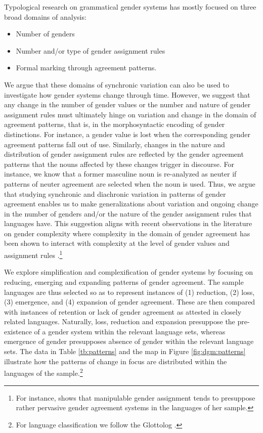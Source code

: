 \documentclass[output=collectionpaper]{langsci/langscibook}
\begin{document}
Typological research on grammatical gender systems  has mostly focused on three broad domains of analysis:
\begin{itemize}
\item Number of genders
\item Number and/or type of gender assignment rules
\item Formal marking through agreement patterns.
\end{itemize}
We argue that these domains of synchronic variation can also be used to investigate how gender systems change through time. However, we suggest that any change in the number of gender values or the number and nature of gender assignment rules must ultimately hinge on variation and change in the domain of agreement patterns, that is, in the morphosyntactic encoding of gender distinctions. For instance, a gender value is lost when the corresponding gender agreement patterns fall out of use. Similarly, changes in the nature and distribution of gender assignment rules are reflected by the gender agreement patterns that the nouns affected by these changes trigger in discourse. For instance, we know that a former masculine noun is re-analyzed as neuter if patterns of neuter agreement are selected when the noun is used. Thus, we argue that studying synchronic and diachronic variation in patterns of gender agreement enables us to make generalizations about variation and ongoing change in the number of genders and/or the nature of the gender assignment rules that languages have. This suggestion aligns with recent observations in the literature on gender complexity where complexity in the domain of gender agreement has been shown to interact with complexity at the level of gender values and assignment rules \citep{Audring2017,DiGarbo2016}.\footnote{For instance, \citet{DiGarbo2016} shows that manipulable gender assignment tends to presuppose rather pervasive gender agreement systems in the languages of her sample.}

We explore simplification and complexification of gender systems by focusing on reducing, emerging and expanding patterns of gender agreement. The sample languages are thus selected so as to represent instances of (1) reduction, (2) loss, (3) emergence, and (4) expansion of gender agreement. These are then compared with instances of retention or lack of gender agreement as attested in closely related languages. Naturally, loss, reduction and expansion presuppose the pre-existence of a gender system within the relevant language sets, whereas emergence of gender presupposes absence of gender within the relevant language sets.  The data in Table \ref{tb:patterns} and the map in Figure \ref{fig:dgm:patterns} illustrate how the patterns of change in focus are distributed within the languages of the sample.\footnote{For language classification we follow the Glottolog \citep{Hammarstroem2018}.}
\end{document}
